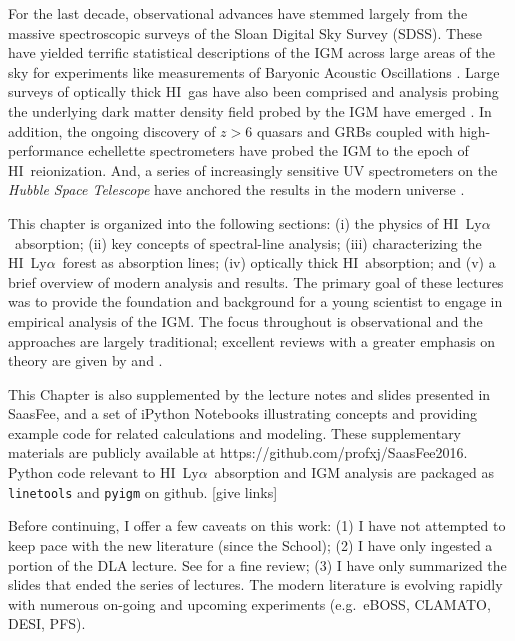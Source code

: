 \documentclass[graybox]{svmult}
\newcommand{\HI}{H{\sc I}}
\def\lya{Ly$\alpha$}
\begin{document}
For the last decade, observational advances
have stemmed largely from the massive spectroscopic
surveys of the Sloan Digital Sky Survey (SDSS).
These have yielded terrific statistical descriptions
of the IGM \cite[]{lee+15} 
across large areas of the sky for experiments
like measurements of Baryonic Acoustic Oscillations
\cite[]{busca13}.
Large surveys of optically thick \HI\ gas
have also been comprised
\cite[]{phw05,pow10,noterdaeme+12} and
analysis probing the underlying dark matter density
field probed by the IGM have emerged \cite[]{font12}.
In addition, the ongoing discovery of $z>6$ quasars 
and GRBs coupled with high-performance echellette
spectrometers have probed the IGM to the epoch
of \HI\ reionization.  And, a series of increasingly
sensitive UV spectrometers on the
{\it Hubble Space Telescope}
have anchored the results in the modern universe
\cite[]{pss00,dt01}.

This chapter is organized into the following sections:
 (i) the physics of \HI\ \lya\ absorption;
 (ii) key concepts of spectral-line analysis;
 (iii) characterizing the \HI\ \lya\ forest as absorption lines;
 (iv) optically thick \HI\ absorption;
 and
 (v) a brief overview of modern analysis and results.
The primary goal of these lectures was to provide the
foundation and background for a young scientist to engage
in empirical analysis of the IGM.
The focus throughout is observational and the approaches
are largely traditional;  excellent reviews with a greater
emphasis on theory are given by \cite{meiksin09} and
\cite{mcquinn16}.  

This Chapter is also supplemented by the lecture notes
and slides presented in SaasFee, and a set of iPython
Notebooks illustrating concepts and providing 
example code for related calculations and modeling.
These supplementary materials are publicly available
at https://github.com/profxj/SaasFee2016.
Python code relevant to \HI\ \lya\ absorption and 
IGM analysis are packaged as  {\tt linetools}
and {\tt pyigm} on github. [give links]

Before continuing, I offer a few caveats on this
work:
(1) I have not attempted to keep pace with the new literature (since the School);
(2) I have only ingested a portion of the DLA lecture.  See
\cite{wgp05} for a fine review;
(3) I have only summarized the slides that ended the series of lectures.
The modern literature is evolving rapidly with numerous
on-going and upcoming experiments (e.g.\ eBOSS, CLAMATO, DESI, 
PFS).

\end{document}
